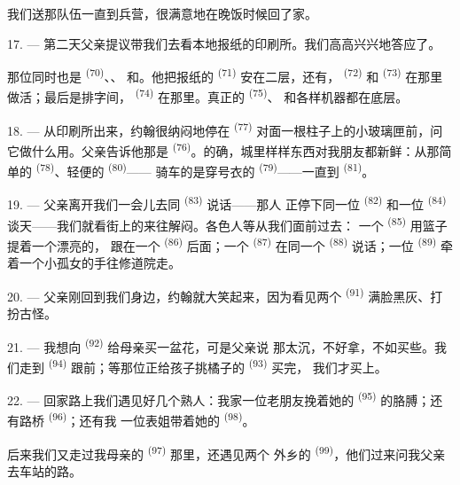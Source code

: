 我们送那队伍一直到兵营，很满意地在晚饭时候回了家。

\VUsaut{3.0mm}

17. --- 第二天父亲提议带我们去看本地报纸的印刷所。我们高高兴兴地答应了。

那位同时也是 \textsuperscript{(70)}、、
和。他把报纸的 \textsuperscript{(71)}
安在二层，还有， \textsuperscript{(72)} 和
 \textsuperscript{(73)} 在那里做活；最后是排字间，
\textsuperscript{(74)} 在那里。真正的 \textsuperscript{(75)}、
和各样机器都在底层。

\VUsaut{3.0mm}

18. --- 从印刷所出来，约翰很纳闷地停在 \textsuperscript{(77)}
对面一根柱子上的小玻璃匣前，问它做什么用。父亲告诉他那是
\textsuperscript{(76)}。的确，城里样样东西对我朋友都新鲜：从那简单的
 \textsuperscript{(78)}、轻便的 \textsuperscript{(80)}——
骑车的是穿号衣的 \textsuperscript{(79)}——一直到
\textsuperscript{(81)}。

19. --- 父亲离开我们一会儿去同 \textsuperscript{(83)} 说话——那人
正停下同一位 \textsuperscript{(82)} 和一位
\textsuperscript{(84)} 谈天——我们就看街上的来往解闷。各色人等从我们面前过去：
一个 \textsuperscript{(85)} 用篮子提着一个漂亮的，
跟在一个 \textsuperscript{(86)} 后面；一个
\textsuperscript{(87)} 在同一个 \textsuperscript{(88)} 说话；一位
 \textsuperscript{(89)} 牵着一个小孤女的手往修道院走。

\VUsaut{3.0mm}

20. --- 父亲刚回到我们身边，约翰就大笑起来，因为看见两个
\textsuperscript{(91)} 满脸黑灰、打扮古怪。

21. --- 我想向 \textsuperscript{(92)} 给母亲买一盆花，可是父亲说
那太沉，不好拿，不如买些。我们走到 \textsuperscript{(94)}
跟前；等那位正给孩子挑橘子的 \textsuperscript{(93)} 买完，
我们才买上。

22. --- 回家路上我们遇见好几个熟人：我家一位老朋友挽着她的
\textsuperscript{(95)} 的胳膊；还有路桥 \textsuperscript{(96)}；还有我
一位表姐带着她的 \textsuperscript{(98)}。

后来我们又走过我母亲的 \textsuperscript{(97)} 那里，还遇见两个
外乡的 \textsuperscript{(99)}，他们过来问我父亲去车站的路。
\VUsaut{6.0mm}
\VUfilet{22mm}
